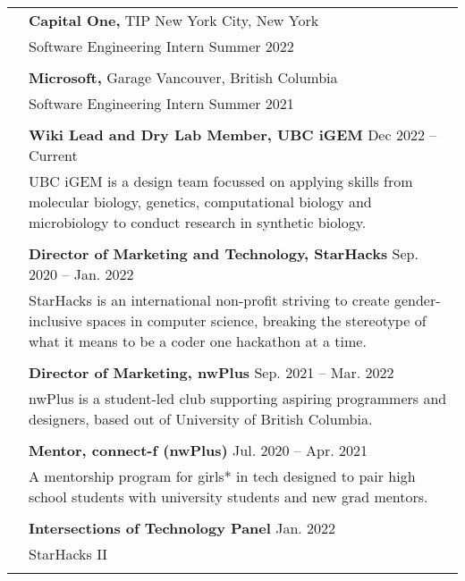 \documentclass[letterpaper, 11pt]{article}
\begin{document}
\begin{longtable}{p{1.3in}p{4.8in}}
{\color{Blue}{Industry Experience}}
& {\textbf{Capital One,}} TIP \hfill New York City, New York\\
& Software Engineering Intern \hfill Summer 2022 \\
& \\
 
& {\textbf{Microsoft,}} Garage \hfill Vancouver, British Columbia\\
& Software Engineering Intern \hfill Summer 2021 \\
& \\

\color{Blue}{Service and outreach}
& \textbf{Wiki Lead and Dry Lab Member, UBC iGEM} \hfill Dec 2022 -- Current \\
& UBC iGEM is a design team focussed on applying skills from molecular biology, genetics, computational biology and microbiology to conduct research in synthetic biology. \\
& \\

& \textbf{Director of Marketing and Technology, StarHacks} \hfill Sep. 2020 -- Jan. 2022 \\
& StarHacks is an international non-profit striving to create gender-inclusive spaces in computer science, breaking the stereotype of what it means to be a coder one hackathon at a time. \\
& \\

& \textbf{Director of Marketing, nwPlus} \hfill Sep. 2021 -- Mar. 2022 \\
& nwPlus is a student-led club supporting aspiring programmers and designers, based out of University of British Columbia. \\
& \\

& \textbf{Mentor, connect-f (nwPlus)} \hfill Jul. 2020 -- Apr. 2021 \\
& A mentorship program for girls* in tech designed to pair high school students with university students and new grad mentors.  \\
& \\

{\color{Blue}{Talks and tutorials}}
& \textbf{Intersections of Technology Panel} \hfill Jan. 2022 \\
& StarHacks II \\
& \\


\end{longtable}
\end{document}
